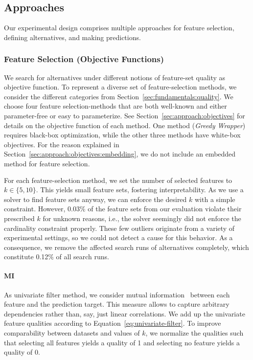 \documentclass{article}
\theoremstyle{definition}
\begin{document}
\subsection{Approaches}
\label{sec:experimental-design:approaches}

Our experimental design comprises multiple approaches for feature selection, defining alternatives, and making predictions.

\subsubsection{Feature Selection (Objective Functions)}
\label{sec:experimental-design:approaches:feature-selection}

We search for alternatives under different notions of feature-set quality as objective function.
To represent a diverse set of feature-selection methods, we consider the different categories from Section~\ref{sec:fundamentals:quality}.
We choose four feature selection-methods that are both well-known and either parameter-free or easy to parameterize.
See Section~\ref{sec:approach:objectives} for details on the objective function of each method.
One method (\emph{Greedy Wrapper}) requires black-box optimization, while the other three methods have white-box objectives.
For the reason explained in Section~\ref{sec:approach:objectives:embedding}, we do not include an embedded method for feature selection.

For each feature-selection method, we set the number of selected features to $k \in \{5,10\}$.
This yields small feature sets, fostering interpretability.
As we use a solver to find feature sets anyway, we can enforce the desired $k$ with a simple constraint.
However, 0.03\% of the feature sets from our evaluation violate their prescribed $k$ for unknown reasons, i.e., the solver seemingly did not enforce the cardinality constraint properly.
These few outliers originate from a variety of experimental settings, so we could not detect a cause for this behavior.
As a consequence, we remove the affected search runs of alternatives completely, which constitute 0.12\% of all search runs.

\paragraph{MI}

As univariate filter method, we consider mutual information~\cite{kraskov2004estimating} between each feature and the prediction target.
This measure allows to capture arbitrary dependencies rather than, say, just linear correlations.
We add up the univariate feature qualities according to Equation~\ref{eq:univariate-filter}.
To improve comparability between datasets and values of $k$, we normalize the qualities such that selecting all features yields a quality of 1 and selecting no feature yields a quality of 0.
\end{document}
